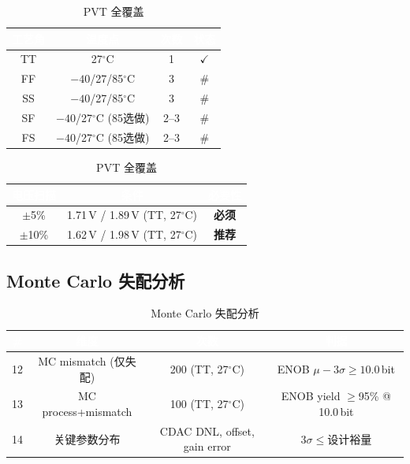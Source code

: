 \documentclass[12pt,a4paper,fontset=none]{ctexart}
\newcommand{\needtable}{\needspace{6cm}}   %
\begin{document}
\begin{table}[H]
\centering
\caption{PVT 全覆盖}
\begin{tabular}{@{}cccc@{}}
\toprule
\rowcolor{tabhead}
\textcolor{white}{\textbf{工艺角}} &
\textcolor{white}{\textbf{温度点}} &
\textcolor{white}{\textbf{次数}} &
\textcolor{white}{\textbf{状态}} \\
\midrule
TT & 27$^\circ$C & 1 & \cellcolor{mygreen}$\checkmark$ \\
FF & $-40$/27/85$^\circ$C & 3 & \cellcolor{myred}\# \\
SS & $-40$/27/85$^\circ$C & 3 & \cellcolor{myred}\# \\
SF & $-40$/27$^\circ$C (85选做) & 2--3 & \cellcolor{myred}\# \\
FS & $-40$/27$^\circ$C (85选做) & 2--3 & \cellcolor{myred}\# \\
\bottomrule
\end{tabular}

\vspace{0.5cm}

\begin{tabular}{@{}ccc@{}}
\toprule
\rowcolor{tabhead}
\textcolor{white}{\textbf{电压扫描}} &
\textcolor{white}{\textbf{条件}} &
\textcolor{white}{\textbf{必要性}} \\
\midrule
$\pm$5\%  & 1.71\,V / 1.89\,V (TT, 27$^\circ$C) & \textbf{必须} \\
$\pm$10\% & 1.62\,V / 1.98\,V (TT, 27$^\circ$C) & \textbf{推荐} \\
\bottomrule
\end{tabular}
\end{table}

\needtable
\subsection{Monte Carlo 失配分析}

\begin{table}[H]
\centering
\caption{Monte Carlo 失配分析}
\begin{tabular}{@{}cccc@{}}
\toprule
\rowcolor{tabhead}
\textcolor{white}{\textbf{\#}} &
\textcolor{white}{\textbf{维度}} &
\textcolor{white}{\textbf{次数}} &
\textcolor{white}{\textbf{判据}} \\
\midrule
12 & MC mismatch (仅失配) & 200 (TT, 27$^\circ$C) & ENOB $\mu\!-\!3\sigma\!\ge\!10.0$\,bit \\
13 & MC process+mismatch & 100 (TT, 27$^\circ$C) & ENOB yield $\ge$95\% @ 10.0\,bit \\
14 & 关键参数分布 & CDAC DNL, offset, gain error & $3\sigma\!\le$设计裕量 \\
\bottomrule
\end{tabular}
\end{table}
\end{document}
